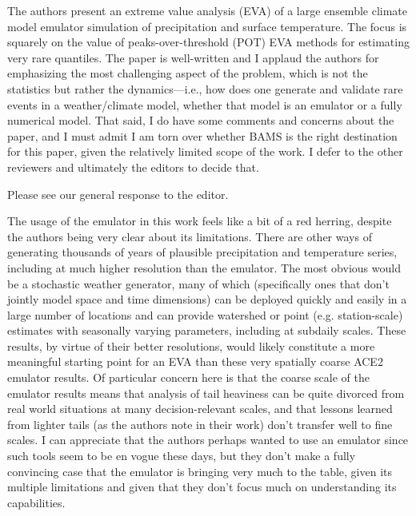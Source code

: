 \documentclass[12pt,english]{reviewresponse}
\begin{document}
\reviewer 

\begin{revcomment}
    The authors present an extreme value analysis (EVA) of a large ensemble climate model emulator simulation of precipitation and surface temperature. The focus is squarely on the value of peaks-over-threshold (POT) EVA methods for estimating very rare quantiles. The paper is well-written and I applaud the authors for emphasizing the most challenging aspect of the problem, which is not the statistics but rather the dynamics—i.e., how does one generate and validate rare events in a weather/climate model, whether that model is an emulator or a fully numerical model. That said, I do have some comments and concerns about the paper, and I must admit I am torn over whether BAMS is the right destination for this paper, given the relatively limited scope of the work. I defer to the other reviewers and ultimately the editors to decide that.
\end{revcomment}

\begin{revresponse}
Please see our general response to the editor.
\end{revresponse}
\begin{revcomment}
    

The usage of the emulator in this work feels like a bit of a red herring, despite the authors being very clear about its limitations. There are other ways of generating thousands of years of plausible precipitation and temperature series, including at much higher resolution than the emulator. The most obvious would be a stochastic weather generator, many of which (specifically ones that don't jointly model space and time dimensions) can be deployed quickly and easily in a large number of locations and can provide watershed or point (e.g. station-scale) estimates with seasonally varying parameters, including at subdaily scales. These results, by virtue of their better resolutions, would likely constitute a more meaningful starting point for an EVA than these very spatially coarse ACE2 emulator results. Of particular concern here is that the coarse scale of the emulator results means that analysis of tail heaviness can be quite divorced from real world situations at many
decision-relevant scales, and that lessons learned from lighter tails (as the authors note in their work) don't transfer well to fine scales. I can appreciate that the authors perhaps wanted to use an emulator since such tools seem to be en vogue these days, but they don't make a fully convincing case that the emulator is bringing very much to the table, given its multiple limitations and given that they don't focus much on understanding its capabilities.
\end{revcomment}
\end{document}
